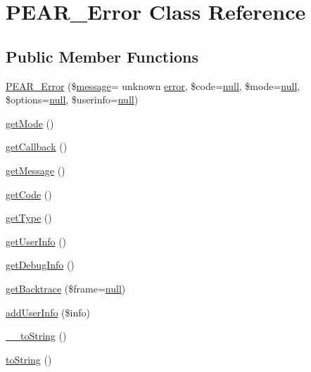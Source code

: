 \hypertarget{classPEAR__Error}{}\section{P\+E\+A\+R\+\_\+\+Error Class Reference}
\label{classPEAR__Error}
\subsection*{Public Member Functions}
\begin{DoxyCompactItemize}
\item 
\hyperlink{classPEAR__Error_a4df056a45879501a8b563c896fe608a3}{P\+E\+A\+R\+\_\+\+Error} (\$\hyperlink{classmessage}{message}= \textquotesingle{}unknown \hyperlink{common_2js_2jquery_8js_ad9c7b7332a24ed93fb21cd053c99bd12}{error}\textquotesingle{}, \$code=\hyperlink{modernizr_8min_8js_a286f9ec831c5e676eeb493248eab9575}{null}, \$mode=\hyperlink{modernizr_8min_8js_a286f9ec831c5e676eeb493248eab9575}{null}, \$options=\hyperlink{modernizr_8min_8js_a286f9ec831c5e676eeb493248eab9575}{null}, \$userinfo=\hyperlink{modernizr_8min_8js_a286f9ec831c5e676eeb493248eab9575}{null})
\item 
\hyperlink{classPEAR__Error_adf8ebb12d192a152c0f3f80b5ca01e7c}{get\+Mode} ()
\item 
\hyperlink{classPEAR__Error_a8060f0ee49b7346e4ca6e04aa70ae25c}{get\+Callback} ()
\item 
\hyperlink{classPEAR__Error_a00beb48b680580de68477d0f77e27510}{get\+Message} ()
\item 
\hyperlink{classPEAR__Error_a54924b41ab0d14ed7007f3c1b3f0ca82}{get\+Code} ()
\item 
\hyperlink{classPEAR__Error_acebd26397af611328c6a7125cbc6284b}{get\+Type} ()
\item 
\hyperlink{classPEAR__Error_a3933a88dc76b37aace3c333ce91f8560}{get\+User\+Info} ()
\item 
\hyperlink{classPEAR__Error_a33eade09a689fdb4e5a79727fa407f13}{get\+Debug\+Info} ()
\item 
\hyperlink{classPEAR__Error_a7892a046070c977e5fcba9fcb749673d}{get\+Backtrace} (\$frame=\hyperlink{modernizr_8min_8js_a286f9ec831c5e676eeb493248eab9575}{null})
\item 
\hyperlink{classPEAR__Error_a229db64a10b64f41644ec19cf3c1e47b}{add\+User\+Info} (\$info)
\item 
\hyperlink{classPEAR__Error_a82c4bf3c440d5b8663b214d799d08d74}{\+\_\+\+\_\+to\+String} ()
\item 
\hyperlink{classPEAR__Error_ae1b052b3d6ae9b74dbc3d348f894b6d2}{to\+String} ()
\end{DoxyCompactItemize}
